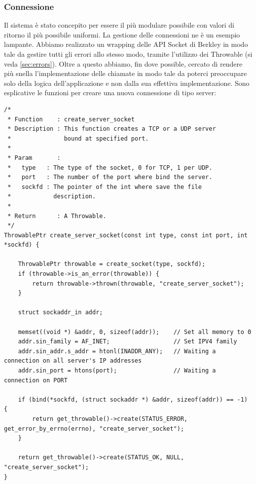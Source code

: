 \documentclass[italian]{tktltiki2}
\begin{document}
\subsubsection*{Connessione}
Il sistema è stato concepito per essere il più modulare possibile con valori di ritorno il più possibile uniformi. La gestione delle connessioni ne è un esempio lampante. Abbiamo realizzato un wrapping delle API Socket di Berkley in modo tale da gestire tutti gli errori allo stesso modo, tramite l'utilizzo dei Throwable (si veda \ref{sec:errors}). Oltre a questo abbiamo, fin dove possible, cercato di rendere più snella l'implementazione delle chiamate in modo tale da poterci preoccupare solo della logica dell'applicazione e non dalla sua effettiva implementazione. Sono esplicative le funzioni per creare una nuova connessione di tipo server:
\begin{lstlisting}
/*
 * Function    : create_server_socket
 * Description : This function creates a TCP or a UDP server
 *               bound at specified port.
 *
 * Param       :
 *   type   : The type of the socket, 0 for TCP, 1 per UDP.
 *   port   : The number of the port where bind the server.
 *   sockfd : The pointer of the int where save the file
 *            description.
 *
 * Return      : A Throwable.
 */
ThrowablePtr create_server_socket(const int type, const int port, int *sockfd) {

    ThrowablePtr throwable = create_socket(type, sockfd);
    if (throwable->is_an_error(throwable)) {
        return throwable->thrown(throwable, "create_server_socket");
    } 

    struct sockaddr_in addr;

    memset((void *) &addr, 0, sizeof(addr));    // Set all memory to 0
    addr.sin_family = AF_INET;                  // Set IPV4 family
    addr.sin_addr.s_addr = htonl(INADDR_ANY);   // Waiting a connection on all server's IP addresses
    addr.sin_port = htons(port);                // Waiting a connection on PORT

    if (bind(*sockfd, (struct sockaddr *) &addr, sizeof(addr)) == -1) {
        return get_throwable()->create(STATUS_ERROR, get_error_by_errno(errno), "create_server_socket");
    }

    return get_throwable()->create(STATUS_OK, NULL, "create_server_socket");
}
\end{lstlisting}
\end{document}
